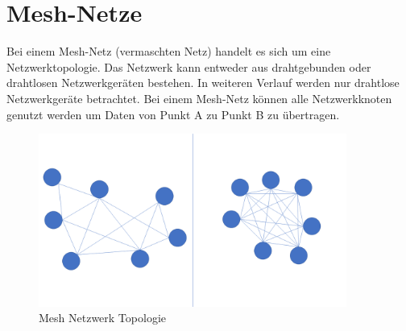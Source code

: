 \section{Mesh-Netze}
\label{sec:Mesh-Netzt}

Bei einem Mesh-Netz (vermaschten Netz) handelt es sich um eine Netzwerktopologie. Das Netzwerk kann entweder aus drahtgebunden oder drahtlosen Netzwerkgeräten bestehen. In weiteren Verlauf werden nur drahtlose Netzwerkgeräte betrachtet. Bei einem Mesh-Netz können alle Netzwerkknoten genutzt werden um Daten von Punkt A zu Punkt B zu übertragen. 
\begin{figure}
	\centering
	\includegraphics[width=0.9\textwidth]{bilder/vermaschtesNetz.png}
	\caption{Mesh Netzwerk Topologie}
	\label{img:vermaschtesNetz}
\end{figure}

